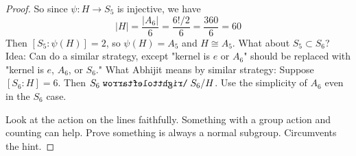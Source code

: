 \documentclass[../psets.tex]{subfiles}
\begin{document}
\begin{enumerate}
\begin{enumerate}
\begin{proof}
            So since $\psi:H\to S_5$ is injective, we have
            \begin{equation*}
                |H| = \frac{|A_6|}{6}
                = \frac{6!/2}{6}
                = \frac{360}{6}
                = 60
            \end{equation*}
            Then $[S_5:\psi(H)]=2$, so $\psi(H)=A_5$ and $H\cong A_5$.
            What about $S_5\subset S_6$? Idea: Can do a similar strategy, except "kernel is $e$ or $A_6$" should be replaced with "kernel is $e$, $A_6$, or $S_6$." What Abhijit means by similar strategy: Suppose $[S_6:H]=6$. Then $S_6\acts S_6/H$. Use the simplicity of $A_6$ even in the $S_6$ case.

            Look at the action on the lines faithfully. Something with a group action and counting can help. Prove something is always a normal subgroup. Circumvents the hint.
        \end{proof}
    \end{enumerate}
\end{enumerate}
\end{document}
